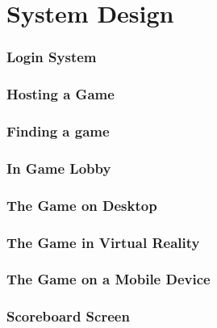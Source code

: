 
\chapter{System Design}

\subsection{Login System}

\subsection{Hosting a Game}

\subsection{Finding a game}

\subsection{In Game Lobby}

\subsection{The Game on Desktop}

\subsection{The Game in Virtual Reality}

\subsection{The Game on a Mobile Device}

\subsection{Scoreboard Screen}
